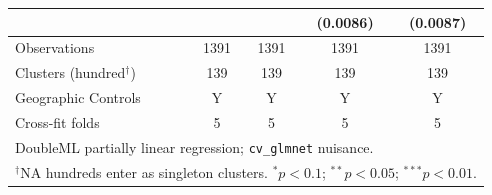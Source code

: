 \begin{table}[H]
\begin{tabular}{lcccc}
 &  &  & (0.0086) & (0.0087) \\
\hline
Observations & 1391 & 1391 & 1391 & 1391 \\
Clusters (hundred$^\dagger$) & 139 & 139 & 139 & 139 \\
Geographic Controls & Y & Y & Y & Y \\
Cross-fit folds & 5 & 5 & 5 & 5 \\
\hline\hline
\multicolumn{5}{l}{\footnotesize DoubleML partially linear regression; \texttt{cv\_glmnet} nuisance.} \\
\multicolumn{5}{l}{\footnotesize $^\dagger$NA hundreds enter as singleton clusters. $^{*}p<0.1$; $^{**}p<0.05$; $^{***}p<0.01$.} \\
\end{tabular}
\end{table}
